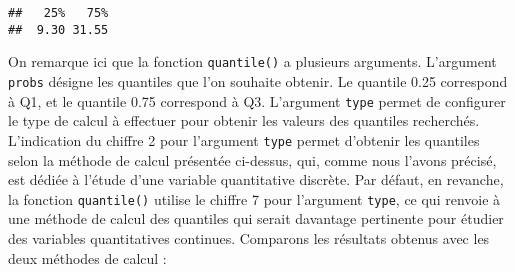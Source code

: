 \documentclass[
  french,
]{book}
\begin{document}
\begin{verbatim}
##   25%   75% 
##  9.30 31.55
\end{verbatim}

On remarque ici que la fonction \texttt{quantile()} a plusieurs arguments. L'argument \texttt{probs} désigne les quantiles que l'on souhaite obtenir. Le quantile 0.25 correspond à Q1, et le quantile 0.75 correspond à Q3. L'argument \texttt{type} permet de configurer le type de calcul à effectuer pour obtenir les valeurs des quantiles recherchés. L'indication du chiffre 2 pour l'argument \texttt{type} permet d'obtenir les quantiles selon la méthode de calcul présentée ci-dessus, qui, comme nous l'avons précisé, est dédiée à l'étude d'une variable quantitative discrète. Par défaut, en revanche, la fonction \texttt{quantile()} utilise le chiffre 7 pour l'argument \texttt{type}, ce qui renvoie à une méthode de calcul des quantiles qui serait davantage pertinente pour étudier des variables quantitatives continues. Comparons les résultats obtenus avec les deux méthodes de calcul :

\providecommand{\docline}[3]{\noalign{\global\setlength{\arrayrulewidth}{#1}}\arrayrulecolor[HTML]{#2}\cline{#3}}

\setlength{\tabcolsep}{0pt}

\renewcommand*{\arraystretch}{1.5}
\end{document}
